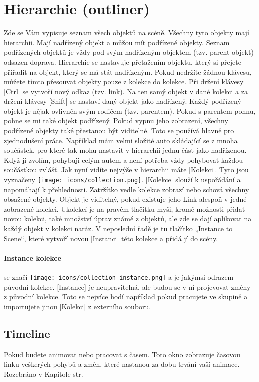 \documentclass[12pt,a4paper]{report}
\begin{document}
	\section{Hierarchie (outliner)}
	Zde se Vám vypisuje seznam všech objektů na scéně. Všechny tyto
	objekty mají hierarchii. Mají nadřízený objekt a můžou mít podřízené
	objekty. Seznam podřízených objektů je vždy pod svým nadřízeným
	objektem (tzv. parent objekt) odsazen doprava. Hierarchie se nastavuje
	přetažením objektu, který si přejete přiřadit na objekt, který se má stát
	nadřízeným. Pokud nedržíte žádnou klávesu, můžete tímto přesouvat
	objekty pouze z kolekce do kolekce. Při držení klávesy [Ctrl] se vytvoří
	nový odkaz (tzv. link). Na ten samý objekt v dané kolekci a za držení
	klávesy [Shift] se nastaví daný objekt jako nadřízený.
	Každý podřízený objekt je nějak ovlivněn svým rodičem (tzv. parentem).
	Pokud s parentem pohnu, pohne se mi také objekt podřízený. Pokud
	vypnu jeho zobrazení, všechny podřízené objekty také přestanou být
	viditelné.
	Toto se používá hlavně pro zjednodušení práce. Například mám velmi
	složité auto skládající se z mnoha součástek, pro které tak mohu nastavit
	v hierarchii jednu část jako nadřízenou. Když ji zvolím, pohybuji celým
	autem a není potřeba vždy pohybovat každou součástkou zvlášť.
	Jak nyní vidíte nejvýše v hierarchii máte [Kolekci]. Tyto jsou vyznačeny
\texttt{[image: icons/collection.png]}. [Kolekce] slouží k uspořádání a napomáhají k přehlednosti. Zatržítko
	vedle kolekce zobrazí nebo schová všechny obsažené objekty. Objekt je
	viditelný, pokud existuje jeho Link alespoň v jedné zobrazené kolekci. Ukolekcí je na pravém tlačítku myši, kromě možnosti přidat novou kolekci,
	také množství úprav známé z objektů, ale zde se dají aplikovat na každý
	objekt v kolekci naráz. V neposlední řadě je tu tlačítko „Instance to
	Scene“, které vytvoří novou [Instanci] této kolekce a přidá jí do scény.
	\paragraph{Instance kolekce} se značí
\texttt{[image: icons/collection-instance.png]}
	a je jakýmsi odrazem původní kolekce.
	[Instance] je neupravitelná, ale budou se v ní projevovat změny
	z původní kolekce. Toto se nejvíce hodí například pokud pracujete ve
	skupině a importujete jinou [Kolekci] z externího souboru.
	
	\subsection{Timeline}
	Pokud budete animovat nebo pracovat s časem. Toto okno zobrazuje
	časovou linku veškerých pohybů a změn, které nastanou za dobu trvání
	vaší animace.
	Rozebráno v Kapitole  str. \pageref{section:keyframes}
	
\end{document}
